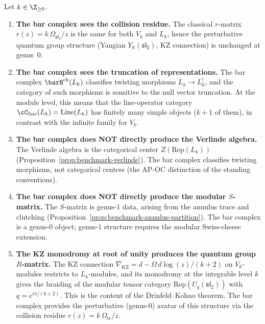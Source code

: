 \begin{proposition}
\label{prop:bar-sees-quantum-group}
Let $k \in \Z_{\ge 0}$.
\begin{enumerate}[label=\textup{(\roman*)},nosep]
\item \textbf{The bar complex sees the collision residue.}
 The classical $r$-matrix
 $r(z) = k\,\Omega_{\mathfrak{sl}_2}/z$ is the same for both
 $V_k$ and $L_k$, hence the perturbative quantum group
 structure \textup{(}Yangian $Y_\hbar(\mathfrak{sl}_2)$,
 KZ connection\textup{)} is unchanged at genus~$0$.

\item \textbf{The bar complex sees the truncation of
 representations.}
 The bar complex $\barB^{\mathrm{ch}}(L_k)$ classifies
 twisting morphisms $L_k \to L_k^!$, and the category
 of such morphisms is sensitive to the null vector
 truncation. At the module level, this means that the
 line-operator category
 $\cC_{\mathrm{line}}(L_k) = \operatorname{Line}(L_k)$
 has finitely many simple objects \textup{(}$k + 1$ of them\textup{)},
 in contrast with the infinite family for $V_k$.

\item \textbf{The bar complex does NOT directly produce the
 Verlinde algebra.}
 The Verlinde algebra is the categorical center
 $Z(\mathrm{Rep}(L_k))$
 \textup{(}Proposition~\textup{\ref{prop:benchmark-verlinde}}\textup{)}.
 The bar complex classifies twisting morphisms, not
 categorical centers
 \textup{(}the AP-OC distinction of the standing
 conventions\textup{)}.

\item \textbf{The bar complex does NOT directly produce
 the modular $S$-matrix.}
 The $S$-matrix is genus-$1$ data, arising from the
 annulus trace and clutching
 \textup{(}Proposition~\textup{\ref{prop:benchmark-annulus-partition}}\textup{)}.
 The bar complex is a genus-$0$ object; genus-$1$
 structure requires the modular Swiss-cheese extension.

\item \textbf{The KZ monodromy at root of unity produces
 the quantum group $R$-matrix.}
 The KZ connection $\nabla_{\mathrm{KZ}} = d - \Omega\,
 d\log(z)/(k+2)$ on $V_k$-modules restricts to $L_k$-modules,
 and its monodromy at the integrable level $k$ gives the
 braiding of the modular tensor category
 $\mathrm{Rep}(U_q(\mathfrak{sl}_2))$ with
 $q = e^{i\pi/(k+2)}$. This is the content of the
 Drinfeld--Kohno theorem. The bar complex provides
 the perturbative (genus-$0$) avatar of this structure
 via the collision residue $r(z) = k\,\Omega_{\mathrm{tr}}/z$.
\end{enumerate}
\end{proposition}


